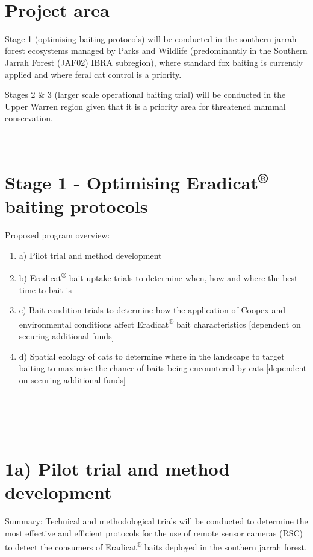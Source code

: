 \documentclass[version=last,
    paper=a4,                               %
    10pt,                                   %
    dvipsnames,
    oneside,                              %
    headings=openany,                       %
    open=any,
    BCOR=7mm,                               %
    DIV=15,     %
]{scrbook}
\begin{document}
~

\section{Project area}

Stage 1 (optimising baiting protocols) will be conducted in the southern
jarrah forest ecosystems managed by Parks and Wildlife (predominantly in
the Southern Jarrah Forest (JAF02) IBRA subregion), where standard fox
baiting is currently applied and where feral cat control is a priority.

Stages 2 \& 3 (larger scale operational baiting trial) will be conducted
in the Upper Warren region given that it is a priority area for
threatened mammal conservation.

~

\section{Stage 1 - Optimising Eradicat\textsuperscript{®} baiting
protocols}

Proposed program overview:

\begin{enumerate}
\itemsep1pt\parskip0pt
\item
  a) Pilot trial and method development
\item
  b) Eradicat\textsuperscript{®} bait uptake trials to determine when,
  how and where the best time to bait is
\item
  c) Bait condition trials to determine how the application of Coopex
  and environmental conditions affect Eradicat\textsuperscript{®} bait
  characteristics {[}dependent on securing additional funds{]}
\item
  d) Spatial ecology of cats to determine where in the landscape to
  target baiting to maximise the chance of baits being encountered by
  cats {[}dependent on securing additional funds{]}
\end{enumerate}

\section{~}

\section{1a) Pilot trial and method development}

Summary: Technical and methodological trials will be conducted to
determine the most effective and efficient protocols for the use of
remote sensor cameras (RSC) to detect the consumers of
Eradicat\textsuperscript{®} baits deployed in the southern jarrah
forest.
\end{document}
